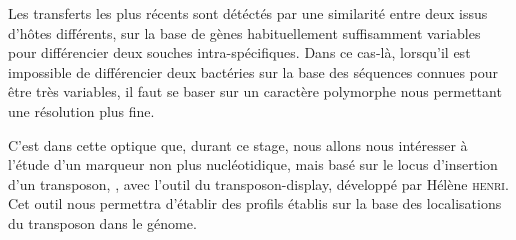 Les transferts les plus récents sont détéctés par une similarité entre deux  issus d'hôtes différents, sur la base de gènes habituellement suffisamment variables pour différencier deux souches intra-spécifiques.
Dans ce cas-là, lorsqu'il est impossible de différencier deux bactéries sur la base des séquences connues pour être très variables, il faut se baser sur un caractère polymorphe nous permettant une résolution plus fine.

C'est dans cette optique que, durant ce stage, nous allons nous intéresser à l'étude  d'un marqueur non plus nucléotidique, mais basé sur le locus d'insertion d'un transposon, , avec l'outil du transposon-display, développé par Hélène \textsc{henri}\cite{memHH}. 
Cet outil nous permettra d'établir des profils établis sur la base des localisations du transposon dans le génome.